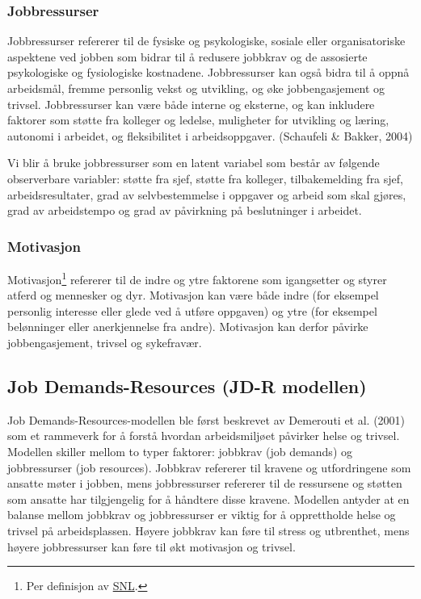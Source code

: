 \documentclass[
  12pt,
  a4paper,
  DIV=11,
  numbers=noendperiod]{scrartcl}
\begin{document}
\subsubsection{Jobbressurser}\label{jobbressurser}

Jobbressurser refererer til de fysiske og psykologiske, sosiale eller
organisatoriske aspektene ved jobben som bidrar til å redusere jobbkrav
og de assosierte psykologiske og fysiologiske kostnadene. Jobbressurser
kan også bidra til å oppnå arbeidsmål, fremme personlig vekst og
utvikling, og øke jobbengasjement og trivsel. Jobbressurser kan være
både interne og eksterne, og kan inkludere faktorer som støtte fra
kolleger og ledelse, muligheter for utvikling og læring, autonomi i
arbeidet, og fleksibilitet i arbeidsoppgaver. (Schaufeli \& Bakker,
2004)

Vi blir å bruke jobbressurser som en latent variabel som består av
følgende observerbare variabler: støtte fra sjef, støtte fra kolleger,
tilbakemelding fra sjef, arbeidsresultater, grad av selvbestemmelse i
oppgaver og arbeid som skal gjøres, grad av arbeidstempo og grad av
påvirkning på beslutninger i arbeidet.

\subsubsection{Motivasjon}\label{motivasjon}

Motivasjon\footnote{Per definisjon av
  \href{https://snl.no/motivasjon\#:~:text=Motivasjon\%20er\%20en\%20samlebetegnelse\%20for,motiveres\%20til\%20\%C3\%A5\%20oppn\%C3\%A5\%20dette}{SNL}.}
refererer til de indre og ytre faktorene som igangsetter og styrer
atferd og mennesker og dyr. Motivasjon kan være både indre (for eksempel
personlig interesse eller glede ved å utføre oppgaven) og ytre (for
eksempel belønninger eller anerkjennelse fra andre). Motivasjon kan
derfor påvirke jobbengasjement, trivsel og sykefravær.

\subsection{Job Demands-Resources (JD-R
modellen)}\label{job-demands-resources-jd-r-modellen}

Job Demands-Resources-modellen ble først beskrevet av Demerouti et al.
(2001) som et rammeverk for å forstå hvordan arbeidsmiljøet påvirker
helse og trivsel. Modellen skiller mellom to typer faktorer: jobbkrav
(job demands) og jobbressurser (job resources). Jobbkrav refererer til
kravene og utfordringene som ansatte møter i jobben, mens jobbressurser
refererer til de ressursene og støtten som ansatte har tilgjengelig for
å håndtere disse kravene. Modellen antyder at en balanse mellom jobbkrav
og jobbressurser er viktig for å opprettholde helse og trivsel på
arbeidsplassen. Høyere jobbkrav kan føre til stress og utbrenthet, mens
høyere jobbressurser kan føre til økt motivasjon og trivsel.
\end{document}
